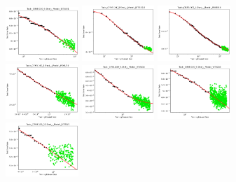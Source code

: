 \documentclass{article} %
\begin{document}
\clearpage
\begin{figure}
    \centering


\includegraphics[width=0.245\textwidth]{figures/scaling_laws_benchmark_dataset_plots/c100_5___BiT_50_1.png}
\includegraphics[width=0.245\textwidth]{figures/scaling_laws_benchmark_dataset_plots/c100_5___BiT_101_3.png}
\includegraphics[width=0.245\textwidth]{figures/scaling_laws_benchmark_dataset_plots/c100_5___MiX_B_16.png}
\includegraphics[width=0.245\textwidth]{figures/scaling_laws_benchmark_dataset_plots/c100_5___MiX_L_16.png}
\includegraphics[width=0.245\textwidth]{figures/scaling_laws_benchmark_dataset_plots/c100_5___ViT_B_16.png}
\includegraphics[width=0.245\textwidth]{figures/scaling_laws_benchmark_dataset_plots/c100_5___ViT_S_16.png}
\includegraphics[width=0.245\textwidth]{figures/scaling_laws_benchmark_dataset_plots/c100_10___BiT_50_1.png}

\end{figure}
\end{document}
